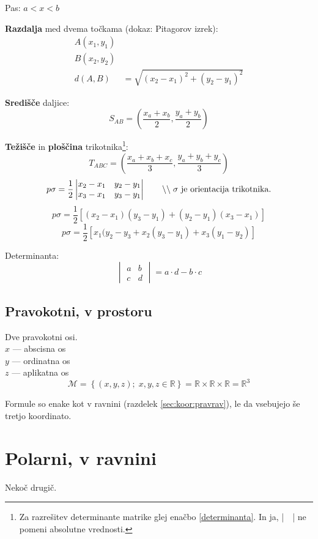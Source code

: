 \documentclass[a4paper,oneside,12pt,fleqn]{article}
\def\R{\ensuremath{\mathbb R}}
\newcommand\krat\cdot
\newcommand{\comment}[1]{\ensuremath{\qquad\backslash\backslash\;}\textnormal{#1}}
\numberwithin{equation}{section}
\begin{document}
Pas: $a < x < b$ 

\textbf{Razdalja} med dvema točkama (dokaz: Pitagorov izrek):
\begin{align*}
  A(x_1, y_1) \\
  B(x_2, y_2) \\
  d(A,B) &= \sqrt{\left( x_2 - x_1 \right)^2 + \left( y_2 - y_1 \right)^2}
\end{align*}

\textbf{Središče} daljice:
\[ S_{AB} = \left( \frac{x_a+x_b}{2}, \frac{y_a+y_b}{2} \right) \]

\textbf{Težišče} in \textbf{ploščina} trikotnika\footnote{Za razrešitev
determinante matrike glej enačbo \eqref{determinanta}. In ja, |\ \ | ne pomeni absolutne
vrednosti.}:
\[ T_{ABC} = \left( \frac{x_a+x_b+x_c}{3},\frac{y_a+y_b+y_c}{3} \right) \]
\[ p\sigma = \frac{1}{2} \begin{vmatrix}
    x_2 - x_1 & y_2 - y_1 \\
    x_3 - x_1 & y_3 - y_1 
\end{vmatrix} \comment{$\sigma$ je orientacija trikotnika.} \]
\[ p\sigma = \frac{1}{2} \left[ (x_2-x_1)(y_3-y_1) + (y_2-y_1)(x_3-x_1) \right] \]
\[ p\sigma = \frac{1}{2} \left[ x_1(y_2-y_3 + x_2(y_3-y_1) + x_3(y_1-y_2) \right] \]

Determinanta:
\begin{equation}
  \begin{vmatrix}
    a & b \\
    c & d
  \end{vmatrix} = a \krat d - b \krat c
  \label{determinanta}
\end{equation}

\subsection{Pravokotni, v prostoru}
\label{sec:koor:pravpro}
Dve pravokotni osi. \\
$x$ --- abscisna os \\
$y$ --- ordinatna os \\
$z$ --- aplikatna os
\[ \mathcal{M} = \left\{ (x,y,z); \; x, y, z \in \R \right\} = \R \times \R \times \R = \R^3 \]

Formule so enake kot v ravnini (razdelek \ref{sec:koor:pravrav}), le da vsebujejo še
tretjo koordinato.

\section{Polarni, v ravnini}
\label{sec:koor:pol}
Nekoč drugič.
\end{document}
